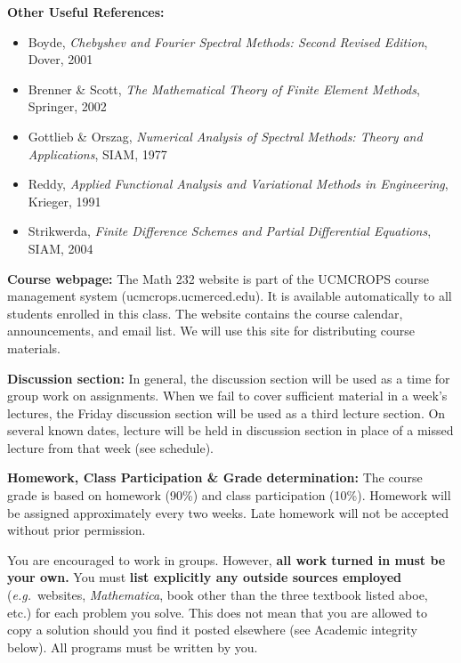 \documentclass{article}
\begin{document}
\textbf{Other Useful References:} 
\begin{itemize}

  \item Boyde, \textit{Chebyshev and Fourier Spectral Methods: Second Revised
Edition}, Dover, 2001

  \item  Brenner \& Scott, \textit{The Mathematical Theory of Finite Element
Methods}, Springer, 2002

  \item Gottlieb \& Orszag, \textit{Numerical Analysis of Spectral Methods:
Theory and Applications}, SIAM, 1977

  \item Reddy, \textit{Applied Functional Analysis and Variational Methods
in Engineering}, Krieger, 1991
 
  \item Strikwerda, \textit{Finite Difference Schemes and Partial
Differential Equations}, SIAM, 2004


\end{itemize}

\textbf{Course webpage:} The Math 232 website is part of the UCMCROPS course
management system \mbox{(ucmcrops.ucmerced.edu)}. 
It is available automatically to all students enrolled in
this class. The website contains the course calendar, announcements, and
email list. We will use this site for distributing course materials.

\textbf{Discussion section:}  In general, the discussion section will be
used as a time for group work on assignments.   When we fail to cover
sufficient material in a week's lectures, the Friday discussion section will
be used as a third lecture section.  On several known dates, lecture will be
held in discussion section in place of a missed lecture from that week (see
schedule).

\textbf{Homework, Class Participation \& Grade determination:} The course
grade is based on homework (90\%) and class participation (10\%).  Homework
will be assigned approximately every two weeks.  Late homework will not be
accepted without prior permission.

You are encouraged to work in groups. However, \textbf{all work turned in
must be your own.} You must \textbf{list explicitly any outside sources
employed} (\textit{e.g.}\ websites, \textit{Mathematica}, book other than
the three textbook listed aboe, etc.) for each problem you solve.  This does
not mean that you are allowed to copy a solution should you find it posted
elsewhere (see Academic integrity below).  All programs must be written by
you.
\end{document}
